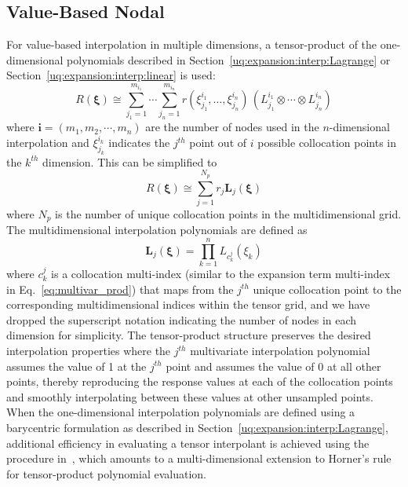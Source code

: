 \subsection{Value-Based Nodal} \label{uq:expansion:sc:value}

For value-based interpolation in multiple dimensions, a tensor-product
of the one-dimensional polynomials described in
Section~\ref{uq:expansion:interp:Lagrange} or
Section~\ref{uq:expansion:interp:linear} is used:
\begin{equation}
R(\boldsymbol{\xi}) \cong \sum_{j_1=1}^{m_{i_1}}\cdots\sum_{j_n=1}^{m_{i_n}}
r\left(\xi^{i_1}_{j_1},\dots , \xi^{i_n}_{j_n}\right)\,
\left(L^{i_1}_{j_1}\otimes\cdots\otimes L^{i_n}_{j_n}\right)
\label{eq:lagrange_tensor}
\end{equation}
where $\boldsymbol{i} = (m_1, m_2, \cdots, m_n)$ are the number of
nodes used in the $n$-dimensional interpolation and $\xi_{j_k}^{i_k}$ 
indicates the $j^{th}$ point out of $i$ possible collocation points 
in the $k^{th}$ dimension.  This can be simplified to
\begin{equation}
R(\boldsymbol{\xi}) \cong \sum_{j=1}^{N_p} r_j \boldsymbol{L}_j(\boldsymbol{\xi})
\label{eq:lagrange_interp_nd}
\end{equation}
where $N_p$ is the number of unique collocation points in the
multidimensional grid.  The multidimensional interpolation polynomials
are defined as
\begin{equation}
\boldsymbol{L}_j(\boldsymbol{\xi}) = \prod_{k=1}^{n} L_{c_k^j}(\xi_k) 
\label{eq:multivar_L}
\end{equation}
where $c_k^j$ is a collocation multi-index (similar to the expansion
term multi-index in Eq.~\ref{eq:multivar_prod}) that maps from the
$j^{th}$ unique collocation point to the corresponding
multidimensional indices within the tensor grid, and we have dropped
the superscript notation indicating the number of nodes in each
dimension for simplicity.  The tensor-product structure preserves the
desired interpolation properties where the $j^{th}$ multivariate
interpolation polynomial assumes the value of 1 at the $j^{th}$ point
and assumes the value of 0 at all other points, thereby reproducing
the response values at each of the collocation points and smoothly
interpolating between these values at other unsampled points.  When
the one-dimensional interpolation polynomials are defined using a
barycentric formulation as described in
Section~\ref{uq:expansion:interp:Lagrange}, additional efficiency in
evaluating a tensor interpolant is achieved using the procedure
in~\cite{Klimke05}, which amounts to a multi-dimensional extension to
Horner's rule for tensor-product polynomial evaluation.

